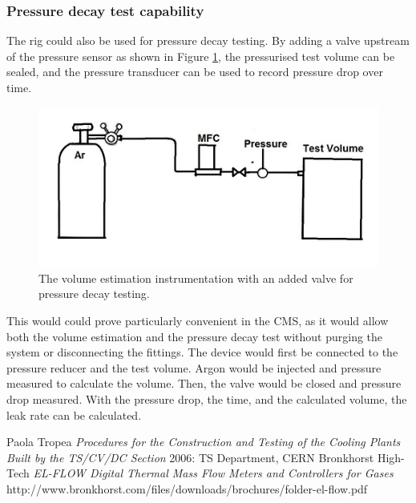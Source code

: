 \documentclass{report}
\begin{document}
\subsubsection{Pressure decay test capability}
The rig could also be used for pressure decay testing. By adding a valve upstream of the pressure sensor as shown in Figure \ref{schematicWithValve}, the pressurised test volume can be sealed, and the pressure transducer can be used to record pressure drop over time.\cite{leakPaola} 
\begin{figure}[h]
\includegraphics[width=\textwidth]{schematicWithValve}
\caption{The volume estimation instrumentation with an added valve for pressure decay testing.}
\label{schematicWithValve}
\end{figure}
This would could prove particularly convenient in the CMS, as it would allow both the volume estimation and the pressure decay test without purging the system or disconnecting the fittings. The device would first be connected to the pressure reducer and the test volume. Argon would be injected and pressure measured to calculate the volume. Then, the valve would be closed and pressure drop measured. With the pressure drop, the time, and the calculated volume, the leak rate can be calculated. 

\begin{thebibliography}{1}
 Paola Tropea {\em Procedures for the Construction and Testing of the Cooling Plants Built by the TS/CV/DC Section} 2006: TS Department, CERN
 Bronkhorst High-Tech {\em EL-FLOW Digital Thermal Mass Flow Meters and Controllers for Gases} http://www.bronkhorst.com/files/downloads/brochures/folder-el-flow.pdf
\end{thebibliography}
\end{document}
